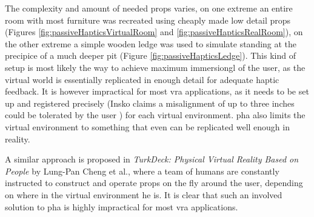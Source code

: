 The complexity and amount of needed props varies, on one extreme an entire room with most furniture was recreated using cheaply made low detail props (Figures \autoref{fig:passiveHapticsVirtualRoom} and \autoref{fig:passiveHapticsRealRoom}), on the other extreme a simple wooden ledge was used to simulate standing at the precipice of a much deeper pit (Figure \autoref{fig:passiveHapticsLedge}).
\newline
This kind of setup is most likely the way to achieve maximum \gls{immersiongl} of the user, as the virtual world is essentially replicated in enough detail for adequate haptic feedback. It is however impractical for most \gls{vra} applications, as it needs to be set up and registered precisely (Insko claims a misalignment of up  to three inches could be tolerated by the user \autocite[p. ~63]{passiveHaptics}) for each virtual environment. \Gls{pha} also limits the virtual environment to something that even can be replicated well enough in reality.
\newline

A similar approach is proposed in \textit{TurkDeck: Physical Virtual Reality Based on People} \autocite{turkDeck} by Lung-Pan Cheng et al., where a team of humans are constantly instructed to construct and operate props on the fly around the user, depending on where in the virtual environment he is. It is clear that such an involved solution to \gls{pha} is highly impractical for most \gls{vra} applications.
